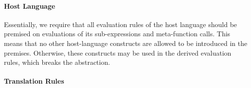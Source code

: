 


\paragraph{Host Language}
Essentially, we require that all evaluation rules of the host language should be premised on evaluations of its sub-expressions and meta-function calls. This means that no other host-language constructs are allowed to be introduced in the premises. Otherwise, these constructs may be used in the derived evaluation rules, which breaks the abstraction.

\paragraph{Translation Rules}

